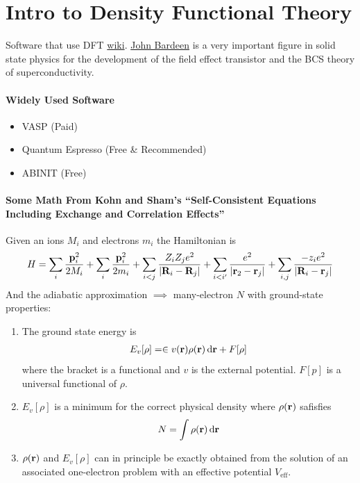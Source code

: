 \documentclass[../main.tex]{subfiles}
\begin{document}
\newpage
{}
\section*{Intro to Density Functional Theory}
Software that use DFT \href{https://en.wikipedia.org/wiki/List_of_quantum_chemistry_and_solid-state_physics_software}{wiki}.
\href{https://en.wikipedia.org/wiki/John_Bardeen}{John Bardeen} is a very important figure in solid
state physics for the development of the field effect transistor and the BCS theory of 
superconductivity.
\paragraph*{Widely Used Software}
\begin{itemize}
    \item VASP (Paid)
    \item Quantum Espresso (Free \& Recommended)
    \item ABINIT (Free)
\end{itemize}
\paragraph*{Some Math From Kohn and Sham's ``Self-Consistent Equations Including Exchange and 
Correlation Effects''}
Given an ions $M_i$ and electrons $m_i$ the Hamiltonian is
\begin{align*}
    H = \sum_i \frac{\vb p_i^2}{2M_i} + \sum_i \frac{\vb p_i^2}{2m_i} 
        + \sum_{i<j} \frac{Z_i Z_j e^2}{\abs{\vb R_i - \vb R_j}}
        + \sum_{i<i'} \frac{e^2}{\abs{\vb r_2 - \vb r_j}}
        + \sum_{i,j} \frac{-z_i e^2}{\abs{\vb R_i - \vb r_j}}
\end{align*}
And the adiabatic approximation $\implies$ many-electron $N$ with ground-state properties:
\begin{enumerate}
    \item The ground state energy is
    \begin{align*}
        E_v[\rho] = \in v(\vb r) \rho (\vb r) \dd{\vb r} + F[\rho]
    \end{align*}
    where the bracket is a functional and $v$ is the external potential. $F[p]$ is a universal
    functional of $\rho$.
    \item $E_v[\rho]$ is a minimum for the correct physical density where $\rho(\vb r)$ safisfies
    \begin{align*}
        N = \int \rho(\vb r) \dd{\vb r}
    \end{align*}
    \item $\rho(\vb r)$ and $E_v[\rho]$ can in principle be exactly obtained from the solution of an
    associated one-electron problem with an effective potential $V_{\text{eff}}$.
\end{enumerate} 
\end{document}
